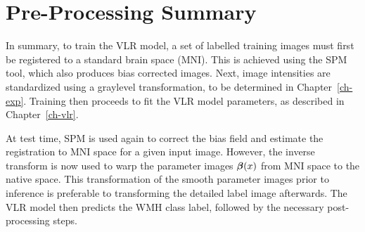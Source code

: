 \section{Pre-Processing Summary}
In summary, to train the VLR model,
a set of labelled training images must first be registered to a standard brain space (MNI).
This is achieved using the SPM  tool, which also produces bias corrected images.
Next, image intensities are standardized using a graylevel transformation,
to be determined in Chapter~\ref{ch-exp}.
Training then proceeds to fit the VLR model parameters, as described in Chapter~\ref{ch-vlr}.
\par
At test time, SPM  is used again to
correct the bias field and estimate the registration to MNI space for a given input image.
However, the inverse transform is now used to warp the parameter images $\bm{\beta}(x)$
from MNI space to the native space.
This transformation of the smooth parameter images prior to inference is preferable
to transforming the detailed label image afterwards.
The VLR model then predicts the WMH class label, followed by the necessary post-processing steps.
